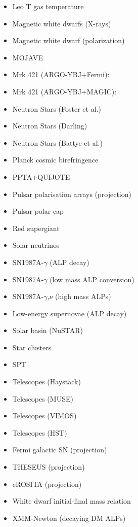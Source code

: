 \documentclass[9pt,twocolumn]{extarticle}
\begin{document}
\begin{mdframed}[everyline=true]
\begin{itemize}
    \item Leo T gas temperature~\cite{Wadekar:2021qae}
    \item Magnetic white dwarfs (X-rays)~\cite{Dessert:2021bkv}
    \item Magnetic white dwarf (polarization)~\cite{Dessert:2022yqq}
    \item MOJAVE~\cite{Ivanov:2018byi}
    \item Mrk 421 (ARGO-YBJ+Fermi):~\cite{Li:2020pcn}
    \item Mrk 421 (ARGO-YBJ+MAGIC):~\cite{Li:2021gxs}
    \item Neutron Stars (Foster et al.)~\cite{Foster:2020pgt}
    \item Neutron Stars (Darling)~\cite{Darling:2020uyo}
    \item Neutron Stars (Battye et al.)~\cite{Battye:2021yue}
   	\item Planck cosmic birefringence~\cite{Fedderke:2019ajk}
    \item PPTA+QUIJOTE~\cite{Castillo:2022zfl}
    \item Pulsar polarisation arrays (projection)~\cite{Liu:2021zlt}
    \item Pulsar polar cap~\cite{Noordhuis:2022ljw}
    \item Red supergiant~\cite{Severino:2022nue}
    \item Solar neutrinos~\cite{Vinyoles2015}
    \item SN1987A-$\gamma$ (ALP decay)~\cite{Jaeckel:2017tud,Hoof:2022xbe}
    \item SN1987A-$\gamma$ (low mass ALP conversion)~\cite{Payez:2014xsa,Hoof:2022xbe}
    \item SN1987A-$\gamma$,$\nu$ (high mass ALPs)~\cite{Caputo:2021rux}
    \item Low-energy supernovae (ALP decay)~\cite{Caputo:2022mah}
    \item Solar basin (NuSTAR)~\cite{DeRocco:2022jyq}
    \item Star clusters~\cite{Dessert:2020lil}
    \item SPT~\cite{SPT-3G:2022ods}
    \item Telescopes (Haystack)~\cite{Blout:2000uc}
    \item Telescopes (MUSE)~\cite{Regis:2020fhw}
    \item Telescopes (VIMOS)~\cite{Grin:2006aw}
    \item Telescopes (HST)~\cite{Nakayama:2022jza,Carenza:2023qxh}
    \item Fermi galactic SN (projection)~\cite{Meyer:2016wrm}
     \item THESEUS (projection)~\cite{Thorpe-Morgan:2020rwc}
    \item eROSITA (projection)~\cite{Dekker:2021bos}
   \item White dwarf initial-final mass relation~\cite{Dolan:2021rya}
   \item XMM-Newton (decaying DM ALPs)~\cite{Foster:2021ngm}
\end{itemize}
\vspace{-2.5em}

\end{mdframed}
\end{document}
